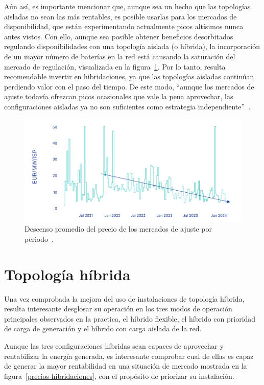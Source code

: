 Aún así, es importante mencionar que, aunque sea un hecho que las topologías aisladas no sean las más rentables, es posible usarlas para los mercados de disponibilidad, que están experimentando actualmente picos altísimos nunca antes vistos. Con ello, aunque sea posible obtener beneficios desorbitados regulando disponibilidades con una topología aislada (o híbrida), la incorporación de un mayor número de baterías en la red está causando la saturación del mercado de regulación, visualizada en la figura~\ref{fig:fcr-price}. Por lo tanto, resulta recomendable invertir en hibridaciones, ya que las topologías aisladas continúan perdiendo valor con el paso del tiempo. De este modo, ``aunque los mercados de ajuste todavía ofrezcan picos ocasionales que vale la pena aprovechar, las configuraciones aisladas ya no son suficientes como estrategia independiente''~\cite{leal2025case}.

\begin{figure}
  \centering
  \includegraphics[width=0.75\linewidth]{figures/fcr-price.jpg}
  \caption[Descenso promedio del precio de los mercados de ajuste por periodo.]{Descenso promedio del precio de los mercados de ajuste por periodo~\cite{leal2025case}.}
  \label{fig:fcr-price}
\end{figure}

\section{Topología híbrida}
\label{makereference7.4}

Una vez comprobada la mejora del uso de instalaciones de topología híbrida, resulta interesante desglosar su operación en los tres modos de operación principales observados en la practica, el híbrido flexible, el híbrido con prioridad de carga de generación y el híbrido con carga aislada de la red.

Aunque las tres configuraciones híbridas sean capaces de aprovechar y rentabilizar la energía generada, es interesante comprobar cual de ellas es capaz de generar la mayor rentabilidad en una situación de mercado mostrada en la figura~\ref{precios-hibridaciones}, con el propósito de priorizar su instalación.


